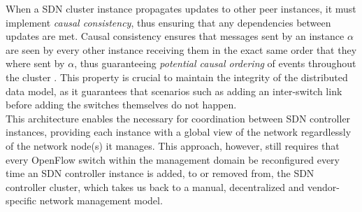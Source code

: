 %
When a \gls{SDN} cluster instance propagates updates to other peer instances, it must implement \emph{causal consistency}, thus ensuring that any dependencies between updates are met.
Causal consistency ensures that messages sent by an instance $\alpha$ are seen by every other instance receiving them in the exact same order that they where sent by $\alpha$, thus guaranteeing \emph{potential causal ordering} of events throughout the cluster \cite{PADI}.
This property is crucial to maintain the integrity of the distributed data model, as it guarantees that scenarios such as adding an inter-switch link before adding the switches themselves do not happen.\\
%
This architecture enables the necessary for coordination between \gls{SDN} controller instances, providing each instance with a global view of the network regardlessly of the network node(s) it manages.
This approach, however, still requires that every OpenFlow switch within the management domain be reconfigured every time an \gls{SDN} controller instance is added, to or removed from, the \gls{SDN} controller cluster, which takes us back to a manual, decentralized and vendor-specific network management model.\\
%

